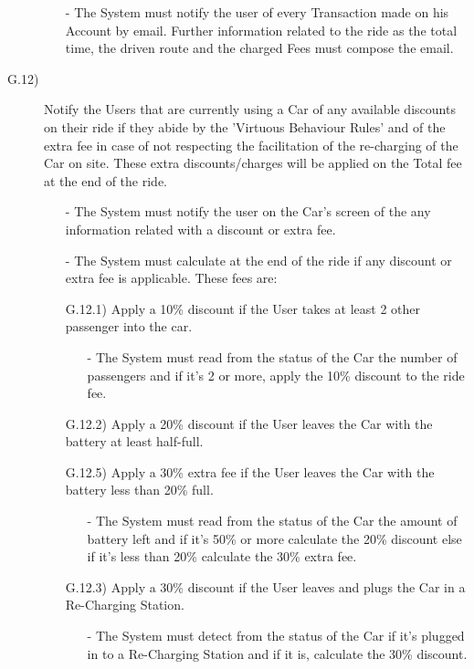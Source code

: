 \documentclass[a4paper]{article}
\begin{document}
\begin{description}
\begin{itemize}
	\item[-]The System must notify the user of every Transaction made on his Account by email. Further information related to the ride as the total time, the driven route and the charged Fees must compose the email.
\end{itemize}
\item [G.12)]Notify the Users that are currently using a Car of any available discounts on their ride if they abide by the 'Virtuous Behaviour Rules' and of the extra fee in case of not respecting the facilitation of the re-charging of the Car on site. These extra discounts/charges will be applied on the Total fee at the end of the ride.
\begin{itemize}
	\item[-]The System must notify the user on the Car’s screen of the any information related with a discount or extra fee.
  	\item[-]The System must calculate at the end of the ride if any discount or extra fee is applicable. These fees are:
	\item [G.12.1)]Apply a 10\% discount if the User takes at least 2 other passenger into the car.
	\begin{itemize}
	\item[-]The System must read from the status of the Car the number of passengers and if it's 2 or more, apply the 10\% discount to the ride fee.
	\end{itemize}
	\item [G.12.2)]Apply a 20\% discount if the User leaves the Car with the battery at least half-full.
	\item [G.12.5)]Apply a 30\% extra fee if the User leaves the Car with the battery less than 20\% full.
	\begin{itemize}
	\item[-]The System must read from the status of the Car the amount of battery left and if it's 50\% or more calculate the 20\% discount else if it's less than 20\% calculate the 30\% extra fee.
	\end{itemize}
	\item [G.12.3)]Apply a 30\% discount if the User leaves and plugs the Car in a Re-Charging Station.
	\begin{itemize}
	\item[-]The System must detect from the status of the Car if it's plugged in to a Re-Charging Station and if it is, calculate the 30\% discount.
	\end{itemize}

\end{itemize}
\end{description}
\end{document}
